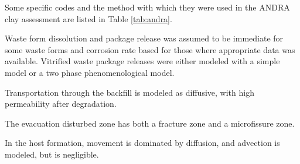 {Some specific codes and the method with which they were used in the \gls{ANDRA} 
clay assessment are listed in Table  \ref{tab:andra}.












Waste form dissolution and package release was assumed to be immediate for some
waste forms and corrosion rate based for those where appropriate data was
available. Vitrified waste package releases were either modeled with a simple
model or a two phase phenomenological model. 


Transportation through the backfill is modeled as diffusive, with high
permeability after degradation.

The evacuation disturbed zone has both a fracture zone and a microfissure zone.

In the host formation, movement is dominated by diffusion, and advection is
modeled, but is negligible.



% 

}
